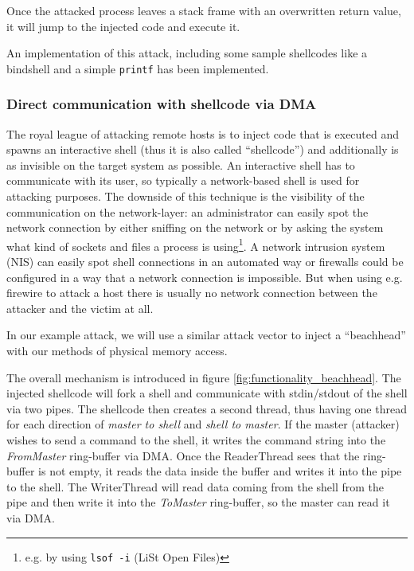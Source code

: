 Once the attacked process leaves a stack frame with an overwritten return value,
it will jump to the injected code and execute it.

An implementation of this attack, including some sample shellcodes like a
bindshell and a simple \texttt{printf} has been implemented. %



\subsubsection{Direct communication with shellcode via DMA}


\label{communication_DMA} The royal league of attacking remote hosts is to
inject code that is executed and spawns an interactive shell (thus it is also
called ``shellcode'') and additionally is as invisible on the target system as
possible.  An interactive shell has to communicate with its user, so typically a
network-based shell is used for attacking purposes. The downside of this
technique is the visibility of the communication on the network-layer: an
administrator can easily spot the network connection by either sniffing on the
network or by asking the system what kind of sockets and files a process is
using\footnote{e.g\@. by using \texttt{lsof -i} (LiSt Open Files)}. A network
intrusion system (NIS) can easily spot shell connections in an automated way or
firewalls could be configured in a way that a network connection is impossible.
But when using e.g\@. firewire to attack a host there is usually no network
connection between the attacker and the victim at all.

In our example attack, we will use a similar attack vector to inject a
``beachhead'' with our methods of physical memory access.

The overall mechanism is introduced in figure \ref{fig:functionality_beachhead}.
The injected shellcode will fork a shell and communicate with stdin/stdout of
the shell via two pipes. The shellcode then creates a second thread, thus having
one thread for each direction of \emph{master to shell} and \emph{shell to
master}. If the master (attacker) wishes to send a command to the shell, it
writes the command string into the \emph{FromMaster} ring-buffer via DMA.  Once
the ReaderThread sees that the ring-buffer is not empty, it reads the data
inside the buffer and writes it into the pipe to the shell.  The WriterThread
will read data coming from the shell from the pipe and then write it into the
\emph{ToMaster} ring-buffer, so the master can read it via DMA.

